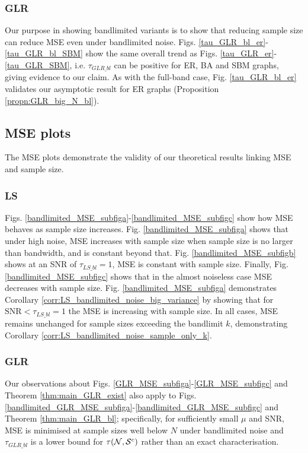 \subsubsection{GLR}
Our purpose in showing bandlimited variants is to show that reducing sample size can reduce MSE even under bandlimited noise. Figs. \ref{tau_GLR_bl_er}- \ref{tau_GLR_bl_SBM} show the same overall trend as Figs. \ref{tau_GLR_er}-\ref{tau_GLR_SBM}, i.e. $\tau_{GLR\_bl}$ can be positive for ER, {\color{black} BA} and SBM graphs, giving evidence to our claim. As with the full-band case, Fig. \ref{tau_GLR_bl_er} validates our asymptotic result for ER graphs (Proposition \ref{propn:GLR_big_N_bl}).

\subsection{MSE plots}
The MSE plots demonstrate the validity of our theoretical results linking MSE and sample size.

\subsubsection{LS}
Figs. \ref{bandlimited_MSE_subfiga}-\ref{bandlimited_MSE_subfigc} show how MSE behaves as sample size increases. Fig. \ref{bandlimited_MSE_subfiga} shows that under high noise, MSE increases with sample size when sample size is no larger than bandwidth, and is constant beyond that. Fig. \ref{bandlimited_MSE_subfigb} shows at an SNR of $\tau_{LS\_bl} = 1$, MSE is constant with sample size. Finally, Fig. \ref{bandlimited_MSE_subfigc} shows that in the almost noiseless case MSE decreases with sample size. Fig. \ref{bandlimited_MSE_subfiga} demonstrates Corollary \ref{corr:LS_bandlimited_noise_big_variance} by showing that for $\textrm{SNR} < \tau_{LS\_bl}=1$ the MSE is increasing with sample size. In all cases, MSE remains unchanged for sample sizes exceeding the bandlimit $k$, demonstrating Corollary \ref{corr:LS_bandlimited_noise_sample_only_k}.

\subsubsection{GLR}
Our observations about Figs. \ref{GLR_MSE_subfiga}-\ref{GLR_MSE_subfigc}  and Theorem \ref{thm:main_GLR_exist} also apply to Figs. \ref{bandlimited_GLR_MSE_subfiga}-\ref{bandlimited_GLR_MSE_subfigc} and Theorem \ref{thm:main_GLR_bl}; specifically, for sufficiently small $\mu$ and SNR, MSE is minimised at sample sizes well below $N$ under bandlimited noise and $\tau_{GLR\_bl}$ is a lower bound for $\tau(\mathcal{N},\mathcal{S}^{c})$ rather than an exact characterisation.

